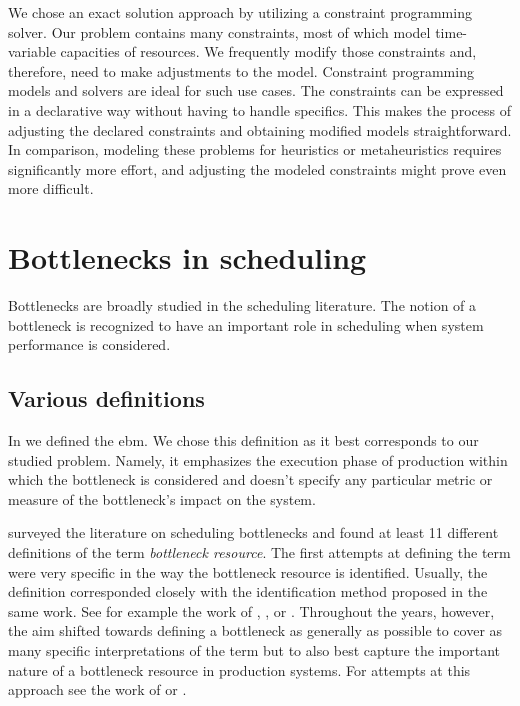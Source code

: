 We chose an exact solution approach by utilizing a constraint programming solver.
Our problem contains many constraints, most of which model time-variable capacities of resources.
We frequently modify those constraints and, therefore, need to make adjustments to the model.
Constraint programming models and solvers are ideal for such use cases.
The constraints can be expressed in a declarative way without having to handle specifics.
This makes the process of adjusting the declared constraints and obtaining modified models straightforward.
In comparison, modeling these problems for heuristics or metaheuristics requires significantly more effort,
and adjusting the modeled constraints might prove even more difficult.

\section{Bottlenecks in scheduling} \label{sec:related-works/bottlenecks-in-scheduling}

Bottlenecks are broadly studied in the scheduling literature.
The notion of a bottleneck is recognized to have an important role in scheduling when system performance is considered.

\subsection{Various definitions} \label{subsec:related-works/bottlenecks-in-scheduling/various-definitions}

In  we defined the \acf{ebm}.
We chose this definition as it best corresponds to our studied problem.
Namely, it emphasizes the execution phase of production within which the bottleneck is considered
and doesn't specify any particular metric or measure of the bottleneck's impact on the system.

\citet{Betterton2012} surveyed the literature on scheduling bottlenecks and found
at least 11 different definitions of the term \emph{bottleneck resource}.
The first attempts at defining the term were very specific in the way the bottleneck resource is identified.
Usually, the definition corresponded closely with the identification method proposed in the same work.
See for example the work of \citet{Lawrence1994}, \citet{Kuo1996}, or \citet{Roser2001}.
Throughout the years, however, the aim shifted towards defining a bottleneck as generally as possible
to cover as many specific interpretations of the term
but to also best capture the important nature of a bottleneck resource in production systems.
For attempts at this approach see the work of \citet{Chiang2001} or \citet{Biller2010}.

